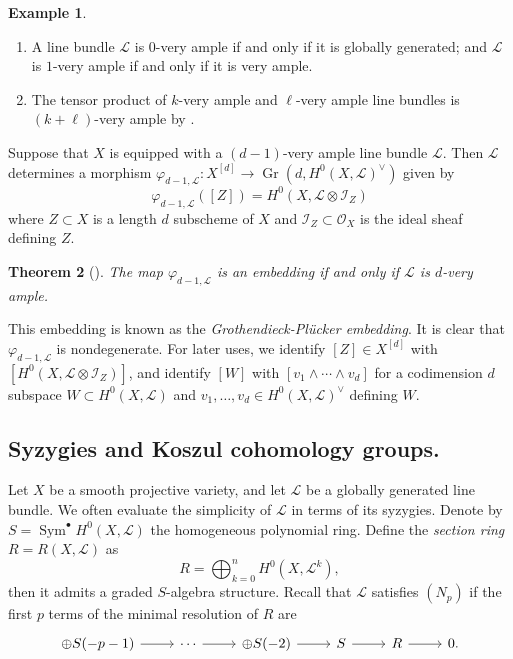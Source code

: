 \documentclass[a4paper]{amsart}
\numberwithin{equation}{section}
\theoremstyle{plain}
\newtheorem{thm}{Theorem}[section]
\theoremstyle{definition}
\newtheorem{exa}[thm]{Example}
\theoremstyle{remark}
\numberwithin{figure}{section}
\numberwithin{table}{section}
\numberwithin{equation}{section}
\def \Ical {\mathcal{I}}
\def \Lcal {\mathcal{L}}
\def \Ocal {\mathcal{O}}
\DeclareMathOperator{\Sym}{Sym}
\DeclareMathOperator{\Gr}{Gr}
\begin{document}
\begin{exa} \leavevmode
    \begin{enumerate} [label = (\alph*)]
        \item A line bundle $\Lcal$ is $0$-very ample if and only if it is globally generated; and $\Lcal$ is $1$-very ample if and only if it is very ample.
        \item The tensor product of $k$-very ample and $\ell$-very ample line bundles is $(k+\ell)$-very ample by \cite[Theorem~1.1]{HTT2005}.
    \end{enumerate}
\end{exa}

Suppose that $X$ is equipped with a $(d-1)$-very ample line bundle $\Lcal$.
Then $\Lcal$ determines a morphism $\varphi_{d-1, \Lcal}:X^{[d]} \rightarrow \Gr(d,H^0(X,\Lcal)^{\vee})$ given by
 \[
  \varphi_{d-1, \Lcal}([Z]) = H^0(X, \Lcal \otimes \Ical_Z)
 \]
where $Z \subset X$ is a length $d$ subscheme of $X$ and $\Ical_Z \subset \Ocal_X$ is the ideal sheaf defining $Z$.

\begin{thm} [{\cite[Main Theorem]{CG1990}}] \label{thm:embedding-into-Grassmannian}
    The map $\varphi_{d-1, \Lcal}$ is an embedding if and only if $\Lcal$ is $d$-very ample.
\end{thm}

This embedding is known as the \textit{Grothendieck-Pl\"ucker embedding}.
It is clear that $\varphi_{d-1, \Lcal}$ is nondegenerate.
For later uses, we identify $[Z] \in X^{[d]}$ with $[H^0(X, \Lcal \otimes \Ical_Z)]$, and identify $[W]$ with $[v_1 \wedge \cdots \wedge v_d]$ for a codimension $d$ subspace $W \subset H^0(X, \Lcal)$ and $v_1, \ldots , v_d \in H^0(X,\Lcal)^{\vee}$ defining $W$.


\subsection{Syzygies and Koszul cohomology groups.} \label{subsec:syzygies-and-koszul-cohomologies}
Let $X$ be a smooth projective variety, and let $\Lcal$ be a globally generated line bundle.
We often evaluate the simplicity of $\Lcal$ in terms of its syzygies.
Denote by $S = \Sym^{\bullet} H^0(X, \Lcal)$ the homogeneous polynomial ring.
Define the \textit{section ring} $R = R(X,\Lcal)$ as
 \[
  R = \bigoplus_{k=0}^{n} H^0(X, \Lcal^{k}),
 \]
then it admits a graded $S$-algebra structure.
Recall that $\Lcal$ satisfies $(N_p)$ if the first $p$ terms of the minimal resolution of $R$ are
 \[
  \begin{tikzcd}
      \oplus S(-p-1) \arrow{r} & \cdots \arrow{r} & \oplus S(-2) \arrow{r} & S \arrow{r} & R \arrow{r} & 0.
  \end{tikzcd}
 \]
\end{document}
